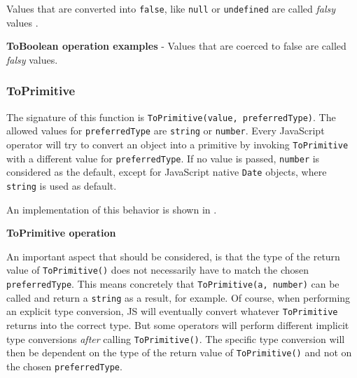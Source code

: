 Values that are converted into \texttt{false}, like \texttt{null} or \texttt{undefined} are called \textit{falsy} values \citep{you-dont-know-js}.

\begin{code}
	\captionsetup{aboveskip=0pt, belowskip=10pt}
	\caption[ToBoolean operation examples]{\textbf{ToBoolean operation examples} - Values that are coerced to false are called \textit{falsy} values.}
	\label{code:background-to-boolean-operation}
\end{code}

\subsubsection{ToPrimitive}
The signature of this function is \texttt{ToPrimitive(value, preferredType)}. The allowed values for \texttt{preferredType} are \texttt{string} or \texttt{number}. Every JavaScript operator will try to convert an object into a primitive by invoking \texttt{ToPrimitive} with a different value for \texttt{preferredType}. If no value is passed, \texttt{number} is considered as the default, except for JavaScript native \texttt{Date} objects, where \texttt{string} is used as default.

An implementation of this behavior is shown in .

\begin{code}
	\captionsetup{aboveskip=0pt, belowskip=10pt}
	\caption[ToPrimitive operation]{\textbf{ToPrimitive operation}}
	\label{code:background-to-primitive-operation}
\end{code}

An important aspect that should be considered, is that the type of the return value of \texttt{ToPrimitive()} does not necessarily have to match the chosen \texttt{preferredType}. This means concretely that \texttt{ToPrimitive(a, number)} can be called and return a \texttt{string} as a result, for example. Of course, when performing an explicit type conversion, JS will eventually convert whatever \texttt{ToPrimitive} returns into the correct type. But some operators will perform different implicit type conversions \textit{after} calling \texttt{ToPrimitive()}. The specific type conversion will then be dependent on the type of the return value of \texttt{ToPrimitive()} and not on the chosen \texttt{preferredType}.

